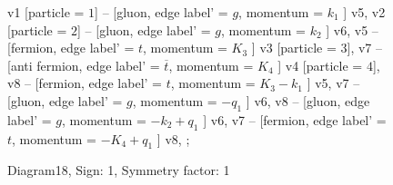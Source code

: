 \documentclass{revtex4}
\begin{document}
\begin{figure}[!htb]
\begin{center}
{    %
v1 [particle = \(1\)] -- [gluon, edge label' = \(g\), momentum = \(k_{1}\) ] v5, 
v2 [particle = \(2\)] -- [gluon, edge label' = \(g\), momentum = \(k_{2}\) ] v6, 
v5 -- [fermion, edge label' = \(t\), momentum = \(K_{3}\) ] v3 [particle = \(3\)], 
v7 -- [anti fermion, edge label' = \(\overline{t}\), momentum = \(K_{4}\) ] v4 [particle = \(4\)], 
v8 -- [fermion, edge label' = \(t\), momentum = \(K_{3} - k_{1}\) ] v5, 
v7 -- [gluon, edge label' = \(g\), momentum = \(-q_{1}\) ] v6, 
v8 -- [gluon, edge label' = \(g\), momentum = \(-k_{2} + q_{1}\) ] v6, 
v7 -- [fermion, edge label' = \(t\), momentum = \(-K_{4} + q_{1}\) ] v8, 
};
\end{center}
\caption{Diagram18, Sign: 1, Symmetry factor: 1}
\end{figure}
\newpage
\end{document}
